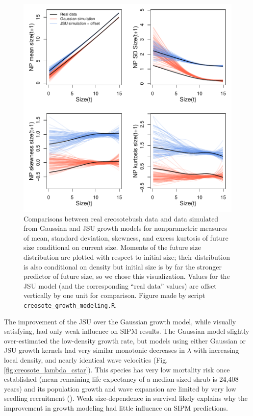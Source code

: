 \documentclass[12pt]{article}
\begin{document}
\begin{spacing}{1.35}
	\begin{figure}[tbp]
		\centering
		\includegraphics[width=1.0\textwidth]{figures/creosote_JSU_fit.pdf}
		\caption{Comparisons between real creosotebush data and data simulated from Gaussian and JSU growth models for nonparametric measures of mean, standard deviation, skewness, and excess kurtosis of future size conditional on current size. 
			Moments of the future size distribution are plotted with respect to initial size; their distribution is also conditional on density but initial size is by far the stronger predictor of future size, so we chose this visualization. 
			Values for the JSU model (and the corresponding ``real data'' values) are offset vertically by one unit for comparison. Figure made by script \texttt{creosote\_growth\_modeling.R}.}
		\label{fig:creosote_JSU}
	\end{figure} 
	
	The improvement of the JSU over the Gaussian growth model, while visually satisfying, had only weak influence on SIPM results. 
	The Gaussian model slightly over-estimated the low-density growth rate, but models using either Gaussian or JSU growth kernels had very similar monotonic decreases in $\lambda$ with increasing local density, and nearly identical wave velocities (Fig. \ref{fig:creosote_lambda_cstar}). 
	This species has very low mortality risk once established (mean remaining life expectancy of a median-sized shrub is 24,408 years) and its population growth and wave expansion are limited by very low seedling recruitment (\citep{drees2023demography}). 
	Weak size-dependence in survival likely explains why the improvement in growth modeling had little influence on SIPM predictions. 
	

\end{spacing}
\end{document}
